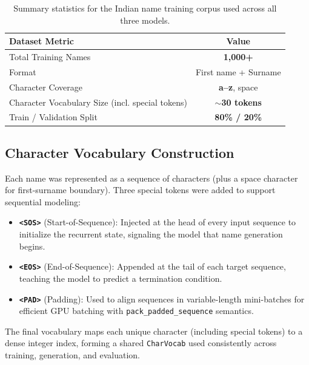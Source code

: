 \documentclass[11pt,a4paper]{article}
\begin{document}
\begin{table}[H]
    \centering
    \renewcommand{\arraystretch}{1.3}
    \begin{tabular}{@{} l c @{}}
        \toprule
        \textbf{\color{iitjblue} Dataset Metric} & \textbf{\color{iitjblue} Value} \\
        \midrule
        Total Training Names & \textbf{1,000+} \\
        Format & First name + Surname \\
        Character Coverage & \textbf{a–z}, space \\
        \rowcolor{highlightbg}
        Character Vocabulary Size (incl. special tokens) & $\sim$\textbf{30 tokens} \\
        Train / Validation Split & \textbf{80\% / 20\%} \\
        \bottomrule
    \end{tabular}
    \vspace{0.5em}
    \caption{Summary statistics for the Indian name training corpus used across all three models.}
\end{table}

\subsection{Character Vocabulary Construction}
Each name was represented as a sequence of characters (plus a space character for first-surname boundary). Three special tokens were added to support sequential modeling:

\begin{itemize}[label=\textcolor{iitjgold}{\textbullet}, itemsep=0.5em]
    \justifying
    \item \textbf{\texttt{<SOS>}} (Start-of-Sequence): Injected at the head of every input sequence to initialize the recurrent state, signaling the model that name generation begins.
    \item \textbf{\texttt{<EOS>}} (End-of-Sequence): Appended at the tail of each target sequence, teaching the model to predict a termination condition.
    \item \textbf{\texttt{<PAD>}} (Padding): Used to align sequences in variable-length mini-batches for efficient GPU batching with \texttt{pack\_padded\_sequence} semantics.
\end{itemize}

The final vocabulary maps each unique character (including special tokens) to a dense integer index, forming a shared \texttt{CharVocab} used consistently across training, generation, and evaluation.
\end{document}
